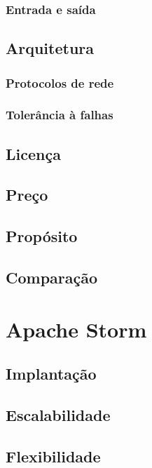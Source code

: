 \subsubsection{Entrada e saída}

\subsection{Arquitetura}

\subsubsection{Protocolos de rede}

\subsubsection{Tolerância à falhas}

\subsection{Licença}

\subsection{Preço}

\subsection{Propósito}

\subsection{Comparação}

\section{Apache Storm}

\subsection{Implantação}

\subsection{Escalabilidade}

\subsection{Flexibilidade}

